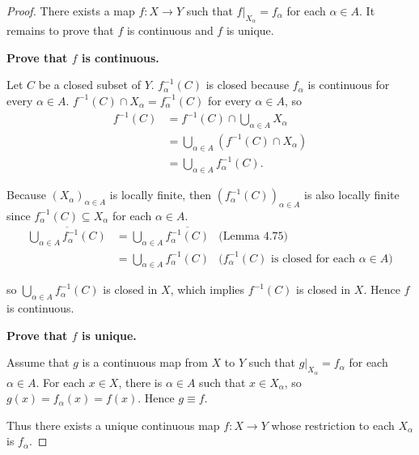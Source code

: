 \begin{proof}
	There exists a map $f: X\to Y$ such that $f\vert_{X_{\alpha}} = f_{\alpha}$ for each $\alpha\in A$. It remains to prove that $f$ is continuous and $f$ is unique.

	\textbf{Prove that $f$ is continuous.}

	Let $C$ be a closed subset of $Y$. $f_{\alpha}^{-1}(C)$ is closed  because $f_{\alpha}$ is continuous for every $\alpha\in A$. $f^{-1}(C) \cap X_{\alpha} = f_{\alpha}^{-1}(C)$ for every $\alpha\in A$, so
	\begin{align*}
		f^{-1}(C) & = f^{-1}(C) \cap \bigcup_{\alpha\in A}X_{\alpha}   \\
		          & = \bigcup_{\alpha\in A} (f^{-1}(C)\cap X_{\alpha}) \\
		          & = \bigcup_{\alpha\in A} f_{\alpha}^{-1}(C).
	\end{align*}

	Because ${(X_{\alpha})}_{\alpha\in A}$ is locally finite, then ${(f_{\alpha}^{-1}(C))}_{\alpha\in A}$ is also locally finite since $f_{\alpha}^{-1}(C) \subseteq X_{\alpha}$ for each $\alpha\in A$.
	\begin{align*}
		\overline{\bigcup_{\alpha\in A} f_{\alpha}^{-1}(C)} & = \bigcup_{\alpha\in A} \overline{f_{\alpha}^{-1}(C)} & \text{(Lemma 4.75)}                                            \\
		                                                    & = \bigcup_{\alpha\in A} f_{\alpha}^{-1}(C)            & \text{($f_{\alpha}^{-1}(C)$ is closed for each $\alpha\in A$)}
	\end{align*}

	so $\bigcup_{\alpha\in A} f_{\alpha}^{-1}(C)$ is closed in $X$, which implies $f^{-1}(C)$ is closed in $X$. Hence $f$ is continuous.

	\textbf{Prove that $f$ is unique.}

	Assume that $g$ is a continuous map from $X$ to $Y$ such that $g\vert_{X_{\alpha}} = f_{\alpha}$ for each $\alpha\in A$. For each $x\in X$, there is $\alpha\in A$ such that $x\in X_{\alpha}$, so $g(x) = f_{\alpha}(x) = f(x)$. Hence $g \equiv f$.

	Thus there exists a unique continuous map $f: X\to Y$ whose restriction to each $X_{\alpha}$ is $f_{\alpha}$.
\end{proof}


